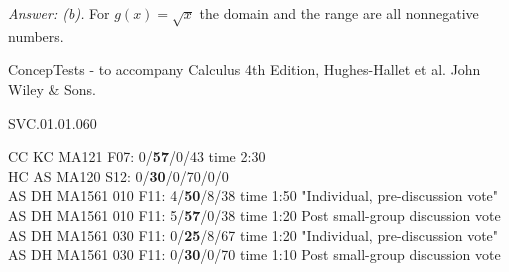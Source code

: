 {\it Answer: (b).} For $g(x) = \sqrt{x}$ the domain and the range are all nonnegative numbers.



\medskip
ConcepTests - to accompany Calculus 4th Edition, Hughes-Hallet et al. John Wiley \& Sons.

SVC.01.01.060

CC KC MA121 F07: 0/{\bf 57}/0/43 time 2:30 \\
HC AS MA120 S12: 0/{\bf30}/0/70/0/0  \\
AS DH MA1561 010 F11: 4/{\bf50}/8/38 time 1:50 "Individual, pre-discussion vote" \\
AS DH MA1561 010 F11: 5/{\bf57}/0/38 time 1:20 Post small-group discussion vote \\
AS DH MA1561 030 F11: 0/{\bf25}/8/67 time 1:20 "Individual, pre-discussion vote" \\
AS DH MA1561 030 F11: 0/{\bf30}/0/70 time 1:10 Post small-group discussion vote \\
